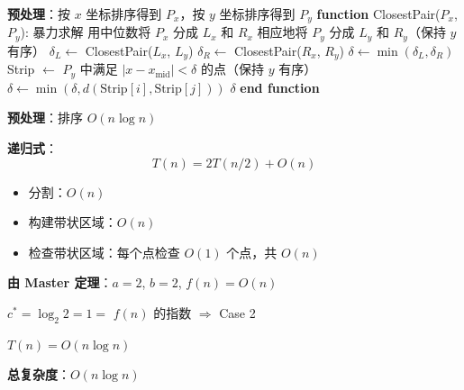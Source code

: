 \documentclass[12pt, a4paper]{ctexart}
\begin{document}
\begin{blackboard}[完整算法]

\begin{algorithmic}[1]
\STATE \textbf{预处理}：按 $x$ 坐标排序得到 $P_x$，按 $y$ 坐标排序得到 $P_y$
\STATE
\STATE \textbf{function} ClosestPair($P_x$, $P_y$):
        \RETURN 暴力求解
    \ENDIF
    \STATE 用中位数将 $P_x$ 分成 $L_x$ 和 $R_x$
    \STATE 相应地将 $P_y$ 分成 $L_y$ 和 $R_y$（保持 $y$ 有序）
    \STATE $\delta_L \gets$ ClosestPair($L_x$, $L_y$)
    \STATE $\delta_R \gets$ ClosestPair($R_x$, $R_y$)
    \STATE $\delta \gets \min(\delta_L, \delta_R)$
    \STATE
    \STATE {}
    \STATE Strip $\gets$ $P_y$ 中满足 $|x - x_{\text{mid}}| < \delta$ 的点（保持 $y$ 有序）
            \STATE $\delta \gets \min(\delta, d(\text{Strip}[i], \text{Strip}[j]))$
        \ENDFOR
    \ENDFOR
    \RETURN $\delta$
\STATE \textbf{end function}
\end{algorithmic}

\end{blackboard}

\begin{complexitybox}[最近点对的复杂度分析]

\textbf{预处理}：排序 $O(n \log n)$

\textbf{递归式}：
\[
T(n) = 2T(n/2) + O(n)
\]

\begin{itemize}
    \item 分割：$O(n)$
    \item 构建带状区域：$O(n)$
    \item 检查带状区域：每个点检查 $O(1)$ 个点，共 $O(n)$
\end{itemize}

\textbf{由 Master 定理}：$a = 2$, $b = 2$, $f(n) = O(n)$

$c^* = \log_2 2 = 1 = $ $f(n)$ 的指数 $\Rightarrow$ Case 2

$T(n) = O(n \log n)$

\textbf{总复杂度}：$O(n \log n)$

\end{complexitybox}
\end{document}

